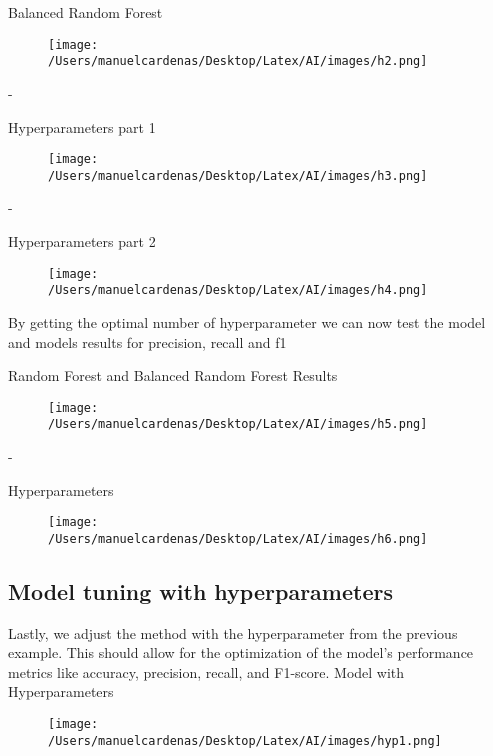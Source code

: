 \documentclass{article}
\begin{document}
    Balanced Random Forest
    \begin{figure}[h]
        \centering
        \texttt{[image: /Users/manuelcardenas/Desktop/Latex/AI/images/h2.png]}
        \label{fig:h2}
    \end{figure}
    - \pagebreak

    Hyperparameters part 1
    \begin{figure}[h]
        \centering
        \texttt{[image: /Users/manuelcardenas/Desktop/Latex/AI/images/h3.png]}
        \label{fig:h3}
    \end{figure}
    - \pagebreak

    Hyperparameters part 2
    \begin{figure}[h]
        \centering
        \texttt{[image: /Users/manuelcardenas/Desktop/Latex/AI/images/h4.png]}
        \label{fig:h4}
    \end{figure}
    
    By getting the optimal number of hyperparameter we can now test the model and models results for precision,  recall and f1 \pagebreak

    Random Forest and Balanced Random Forest Results
    \begin{figure}[h]
        \centering
        \texttt{[image: /Users/manuelcardenas/Desktop/Latex/AI/images/h5.png]}
        \label{fig:h5}
    \end{figure}
    - \pagebreak

    Hyperparameters
    \begin{figure}[h]
        \centering
        \texttt{[image: /Users/manuelcardenas/Desktop/Latex/AI/images/h6.png]}
        \label{fig:h6}
    \end{figure}

    \subsection{Model tuning with hyperparameters}

    Lastly, we adjust the method with the hyperparameter from the previous example. This should allow for the optimization
     of the model's performance metrics like accuracy, precision, recall, and F1-score.\pagebreak
     Model with Hyperparameters
     \begin{figure}[h]
         \centering
         \texttt{[image: /Users/manuelcardenas/Desktop/Latex/AI/images/hyp1.png]}
         \label{fig:hyp1}
     \end{figure}
 
\end{document}
